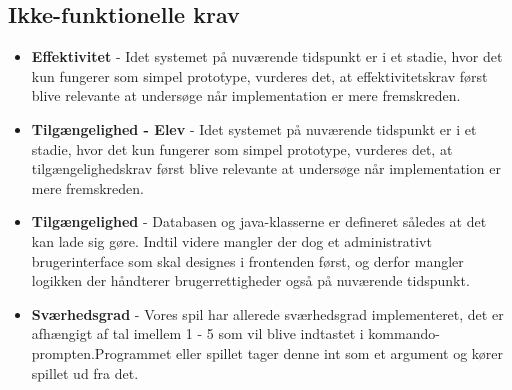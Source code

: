 \documentclass[12pt, a4paper]{article}
\begin{document}
\subsection{Ikke-funktionelle krav}
\begin{itemize}
    \item \textbf{Effektivitet} - %
    Idet systemet på nuværende tidspunkt er i et stadie, hvor det kun fungerer som simpel prototype, vurderes det, at effektivitetskrav først blive relevante at undersøge når implementation er mere fremskreden.
    
    \item \textbf{Tilgængelighed - Elev} - %
    Idet systemet på nuværende tidspunkt er i et stadie, hvor det kun fungerer som simpel prototype, vurderes det, at tilgængelighedskrav først blive relevante at undersøge når implementation er mere fremskreden.
    \item \textbf{Tilgængelighed} - %
    Databasen og java-klasserne er defineret således at det kan lade sig gøre. Indtil videre mangler der dog et administrativt brugerinterface som skal designes i frontenden først, og derfor mangler logikken der håndterer brugerrettigheder også på nuværende tidspunkt.
    
    \item \textbf{Sværhedsgrad} - %
    Vores spil har allerede sværhedsgrad implementeret, det er afhængigt af tal imellem 1 - 5 som vil blive indtastet i kommando-prompten.Programmet eller spillet tager denne int som et argument og kører spillet ud fra det.
    
    
\end{itemize}
\end{document}
